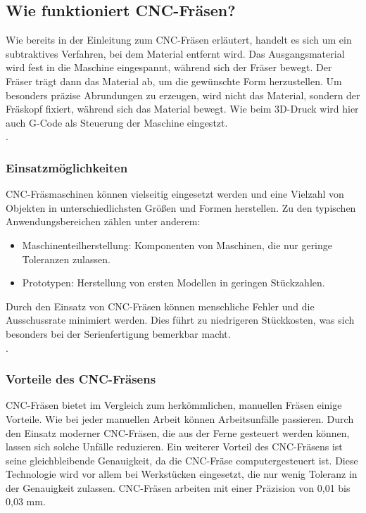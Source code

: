\subsection{Wie funktioniert CNC-Fräsen?}
Wie bereits in der Einleitung zum CNC-Fräsen erläutert, handelt es sich um ein subtraktives Verfahren, bei dem Material entfernt wird. Das Ausgangsmaterial wird fest in die Maschine eingespannt, während sich der Fräser bewegt. Der Fräser trägt dann das Material ab, um die gewünschte Form herzustellen. Um besonders präzise Abrundungen zu erzeugen, wird nicht das Material, sondern der Fräskopf fixiert, während sich das Material bewegt. Wie beim 3D-Druck wird hier auch G-Code als Steuerung der Maschine eingestzt. \\
\textcite{CNCFraesen2} \textcite{CNCFraesen3}.


\subsubsection{Einsatzmöglichkeiten}
CNC-Fräsmaschinen können vielseitig eingesetzt werden und eine Vielzahl von Objekten in unterschiedlichsten Größen und Formen herstellen. Zu den typischen Anwendungsbereichen zählen unter anderem:

\begin{itemize}
	\item Maschinenteilherstellung: Komponenten von Maschinen, die nur geringe Toleranzen zulassen.
	\item Prototypen: Herstellung von ersten Modellen in geringen Stückzahlen.
\end{itemize}

Durch den Einsatz von CNC-Fräsen können menschliche Fehler und die Ausschussrate minimiert werden. Dies führt zu niedrigeren Stückkosten, was sich besonders bei der Serienfertigung bemerkbar macht.\\
 \textcite{CNCFraesen2} \textcite{CNCFraesen3}.

\subsubsection{Vorteile des CNC-Fräsens}
CNC-Fräsen bietet im Vergleich zum herkömmlichen, manuellen Fräsen einige Vorteile. Wie bei jeder manuellen Arbeit können Arbeitsunfälle passieren. Durch den Einsatz moderner CNC-Fräsen, die aus der Ferne gesteuert werden können, lassen sich solche Unfälle reduzieren. Ein weiterer Vorteil des CNC-Fräsens ist seine gleichbleibende Genauigkeit, da die CNC-Fräse computergesteuert ist. Diese Technologie wird vor allem bei Werkstücken eingesetzt, die nur wenig Toleranz in der Genauigkeit zulassen. CNC-Fräsen arbeiten mit einer Präzision von 0,01 bis 0,03 mm. \\
\textcite{CNCFraesenVorteile}

